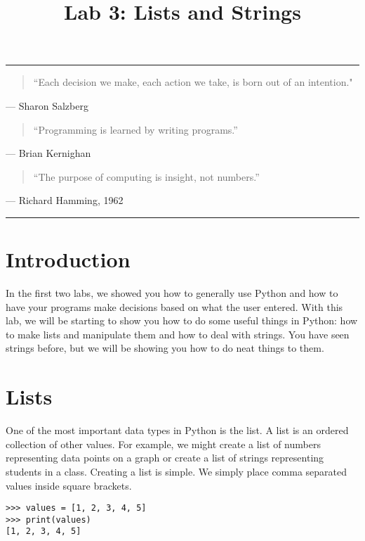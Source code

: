 \documentclass[11pt]{cselabheader}
\title{Lab 3: Lists and Strings}
\begin{document}
\maketitle

\hrule

\begin{quotation}
``Each decision we make, each action we take, is born out of an intention."
\end{quotation}
\begin{flushright}
--- Sharon Salzberg
\end{flushright}

\begin{quotation}
``Programming is learned by writing programs.''
\end{quotation}
\begin{flushright}
--- Brian Kernighan
\end{flushright}

\begin{quotation}
``The purpose of computing is insight, not numbers.''
\end{quotation}
\begin{flushright}
--- Richard Hamming, 1962
\end{flushright}

\hrule

\section{Introduction}
In the first two labs, we showed you how to generally use Python and how to
have your programs make decisions based on what the user entered. With this
lab, we will be starting to show you how to do some useful things in Python:
how to make lists and manipulate them and how to deal with strings. You have
seen strings before, but we will be showing you how to do neat things to them.

\section{Lists}
One of the most important data types in Python is the list. A list is an ordered collection of other values. For example, we might create a list of numbers representing data points on a graph or create a list of strings representing students in a class. Creating a list is simple. We simply place comma separated values inside square brackets.

\begin{lstlisting}[style=ipython]
>>> values = [1, 2, 3, 4, 5]
>>> print(values)
[1, 2, 3, 4, 5]
\end{lstlisting}
\end{document}
